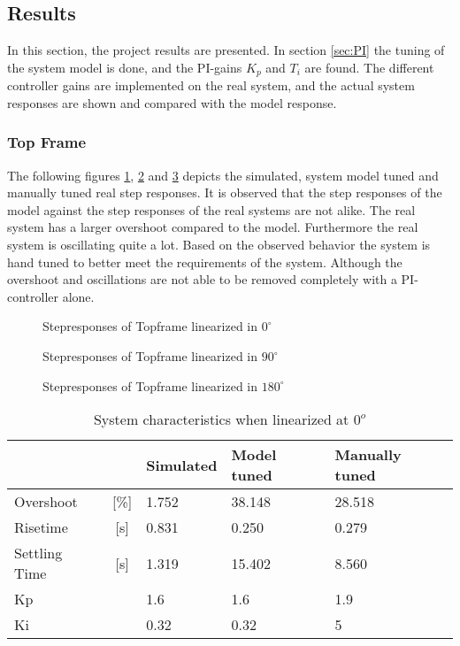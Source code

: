 \documentclass[../../Main]{subfiles}
\begin{document}
\subsection{Results}
\label{sec:results}
In this section, the project results are presented. In section \ref{sec:PI} the tuning of the system model is done, and the PI-gains $K_p$ and $T_i$ are found. The different controller gains are implemented on the real system, and the actual system responses are shown and compared
with the model response.

\subsubsection{Top Frame}
\label{sec:top_frame_results}

The following figures \ref{fig:top_0}, \ref{fig:top_90} and \ref{fig:top_180} depicts the simulated, system model tuned and manually tuned real step responses.
It is observed that the step responses of the model against the step responses of the real
systems are not alike. The real system has a larger overshoot compared to the model.
Furthermore the real system is oscillating quite a lot. Based on the observed behavior
the system is hand tuned to better meet the requirements of the system. Although the
overshoot and oscillations are not able to be removed completely with a PI-controller
alone.


\begin{figure}[H]
  \def\svgwidth{\textwidth}
  
  \caption{Stepresponses of Topframe linearized in $0^{\circ}$}
  \label{fig:top_0}
\end{figure}


\begin{figure}[H]	
  \def\svgwidth{\textwidth}
  
  \caption{Stepresponses of Topframe linearized in $90^{\circ}$}
  \label{fig:top_90}
\end{figure}

\begin{figure}[H]
  \def\svgwidth{\textwidth}
  
  \caption{Stepresponses of Topframe linearized in $180^{\circ}$}
  \label{fig:top_180}
\end{figure}



\begin{table}[H]
	\centering
	\begin{tabular}{lc|*{3}{l}}
		&&Simulated&Model tuned&Manually tuned\\
		\hline
		Overshoot&[\%] &1.752&38.148&28.518\\
		Risetime&[\si{s}]&0.831&0.250&0.279\\
		Settling Time&[\si{s}]&1.319&15.402&8.560\\
		Kp&&1.6&1.6&1.9\\
		Ki&&0.32&0.32&5
	\end{tabular}
	\caption{System characteristics when linearized at $0^o$}
	\label{tab:0_top}
\end{table}
\end{document}

